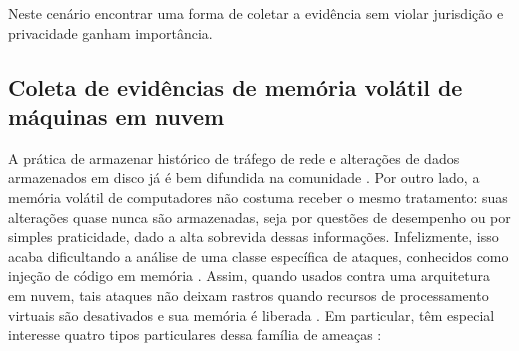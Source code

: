 Neste cenário encontrar uma forma de coletar a evidência sem violar jurisdição e privacidade ganham importância.


\subsection{Coleta de evidências de memória volátil de máquinas em nuvem}
\label{sec:forensenuvem}

A prática de armazenar histórico de tráfego de rede e alterações de dados armazenados em disco já é bem difundida na comunidade .
%
Por outro lado, a memória volátil de computadores não costuma receber o mesmo tratamento: suas alterações quase nunca são armazenadas, seja por questões de desempenho  ou por simples praticidade, dado a alta sobrevida dessas informações.
%
Infelizmente, isso acaba dificultando a análise de uma classe específica de ataques, conhecidos como injeção de código em memória \cite{CaseMemoryForensics:2014}. 
%
Assim, quando usados contra uma arquitetura em nuvem, tais ataques não deixam rastros quando recursos de processamento virtuais são desativados e sua memória é liberada \cite{VomelMemoryAcquisition:2013,CaseMemoryForensics:2014}.
%
Em particular, têm especial interesse quatro tipos particulares dessa família de ameaças \cite{CaseMemoryForensics:2014}:


